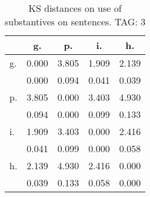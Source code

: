 \begin{table}[h!]
\begin{center}
\begin{tabular}{| l | c | c | c | c |}\hline
 & g. & p. & i. & h. \\\hline
g. & 0.000  & 3.805  & 1.909  & 2.139 \\\hline
 & 0.000  & 0.094  & 0.041  & 0.039 \\\hline
p. & 3.805  & 0.000  & 3.403  & 4.930 \\\hline
 & 0.094  & 0.000  & 0.099  & 0.133 \\\hline
i. & 1.909  & 3.403  & 0.000  & 2.416 \\\hline
 & 0.041  & 0.099  & 0.000  & 0.058 \\\hline
h. & 2.139  & 4.930  & 2.416  & 0.000 \\\hline
 & 0.039  & 0.133  & 0.058  & 0.000 \\\hline
\end{tabular}
\caption{KS distances on use of substantives on sentences. TAG: 3}
\end{center}
\end{table}